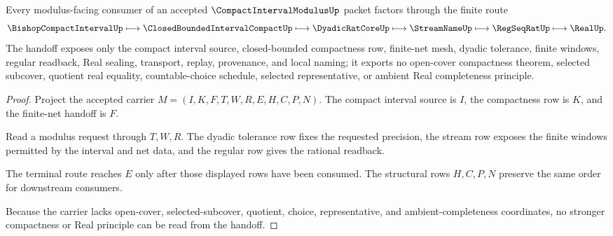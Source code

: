 \begin{theorem}
\label{thm:compact-interval-modulus-finite-net-handoff}
Every modulus-facing consumer of an accepted $\CompactIntervalModulusUp$ packet factors through the finite route
$$
\BishopCompactIntervalUp
\longmapsto
\ClosedBoundedIntervalCompactUp
\longmapsto
\DyadicRatCoreUp
\longmapsto
\StreamNameUp
\longmapsto
\RegSeqRatUp
\longmapsto
\RealUp .
$$
The handoff exposes only the compact interval source, closed-bounded compactness row, finite-net mesh, dyadic tolerance, finite windows, regular readback, Real sealing, transport, replay, provenance, and local naming; it exports no open-cover compactness theorem, selected subcover, quotient real equality, countable-choice schedule, selected representative, or ambient Real completeness principle.
\end{theorem}
\begin{proof}
Project the accepted carrier $M=(I,K,F,T,W,R,E,H,C,P,N)$. The compact interval source is $I$, the compactness row is $K$, and the finite-net handoff is $F$.

Read a modulus request through $T,W,R$. The dyadic tolerance row fixes the requested precision, the stream row exposes the finite windows permitted by the interval and net data, and the regular row gives the rational readback.

The terminal route reaches $E$ only after those displayed rows have been consumed. The structural rows $H,C,P,N$ preserve the same order for downstream consumers.

Because the carrier lacks open-cover, selected-subcover, quotient, choice, representative, and ambient-completeness coordinates, no stronger compactness or Real principle can be read from the handoff.
\end{proof}

